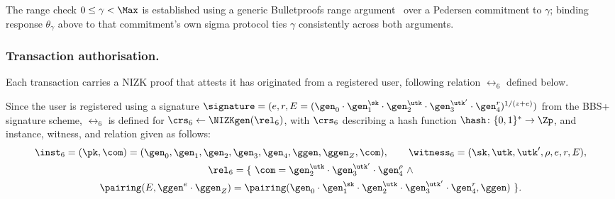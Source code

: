 The range check $0 \leq \gamma < \Max$ is established using a generic
Bulletproofs range argument~\cite{SP:BBBPWM18} over a Pedersen commitment to
$\gamma$; binding response $\theta_\gamma$ above to that commitment's own sigma
protocol ties $\gamma$ consistently across both arguments.

\subsubsection*{Transaction authorisation.}\label{sec:tx-auth} Each transaction
carries a NIZK proof that attests it has originated from a registered user,
following relation $\rel_6$ defined below.

Since the user is registered using a signature $\signature = (e, r, E =
({\gen_0}\cdot\gen_1^{\sk} \cdot \gen_2^{\utk}\cdot\gen_3^{\utk'}\cdot
\gen_4^r)^{1/(z+e)})$ from the BBS+ signature scheme, $\rel_6$ is defined for
$\crs_6 \leftarrow \NIZKgen(\rel_6)$, with $\crs_6$ describing a hash function
$\hash \colon \{0,1\}^* \rightarrow \Zp$, and instance, witness, and relation
given as follows:
%
\begin{equation} \begin{gathered}
%
  \inst_6 = (\pk, \com) = (\gen_0, \gen_1, \gen_2, \gen_3, \gen_4, \ggen,
  \ggen_Z, \com), \qquad \witness_6 = (\sk, \utk, \utk', \rho, e, r, E), \\
%
  \rel_6 = \{\ \com = \gen_2^{\utk}\cdot\gen_3^{\utk'}\cdot\gen_4^{\rho} \
  \wedge \\ \pairing(E, \ggen^e\cdot\ggen_Z) =
\pairing({\gen_0}\cdot\gen_1^{\sk}\cdot\gen_2^{\utk}\cdot\gen_3^{\utk'}\cdot
\gen_4^r, \ggen)\ \}.
%
\end{gathered} \end{equation}
%

